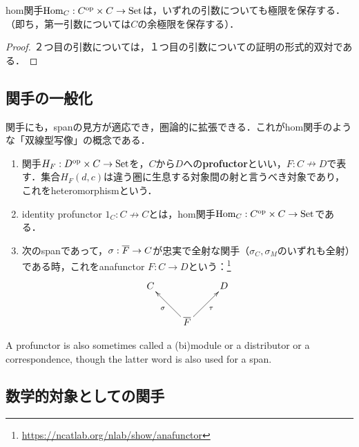 \documentclass[uplatex,dvipdfmx]{jsreport}
\begin{document}
\begin{proposition}[hom関手は極限を保存する]\mbox{}
    hom関手$\mathrm{Hom}_C:C^{\mathrm{op}}\times C\to\mathrm{Set}$は，いずれの引数についても極限を保存する．（即ち，第一引数については$C$の余極限を保存する）．
\end{proposition}
\begin{proof}
    ２つ目の引数については，１つ目の引数についての証明の形式的双対である．
\end{proof}

\subsection{関手の一般化}

\begin{tcolorbox}[colframe=ForestGreen, colback=ForestGreen!10!white, breakable ,colbacktitle=ForestGreen!40!white, coltitle=black,fonttitle=\bfseries\sffamily,
    title=]
    関手にも，spanの見方が適応でき，圏論的に拡張できる．これがhom関手のような「双線型写像」の概念である．
\end{tcolorbox}

\begin{definition}\mbox{}
    \begin{enumerate}
        \item 関手$H_F:D^{\mathrm{op}}\times C\to\mathrm{Set}$を，$C$から$D$への\textbf{profuctor}といい，$F:C\nrightarrow D$で表す．集合$H_F(d,c)$は違う圏に生息する対象間の射と言うべき対象であり，これをheteromorphismという．
        \item identity profunctor $1_C:C\nrightarrow C$とは，hom関手$\mathrm{Hom}_C:C^{\mathrm{op}}\times C\to\mathrm{Set}$である．
        \item 次のspanであって，$\sigma:\overline{F}\to C$が忠実で全射な関手（$\sigma_C,\sigma_M$のいずれも全射）である時，これをanafunctor $F:C\to D$という：\footnote{\url{https://ncatlab.org/nlab/show/anafunctor}}
        \[\xymatrix{
            C&&D\\
            &\o{F}\ar[ul]^-{\sigma}\ar[ur]_-{\tau}
        }\]
    \end{enumerate}
\end{definition}
\begin{remark}
    A profunctor is also sometimes called a (bi)module or a distributor or a correspondence, though the latter word is also used for a span.
\end{remark}

\subsection{数学的対象としての関手}
\end{document}
